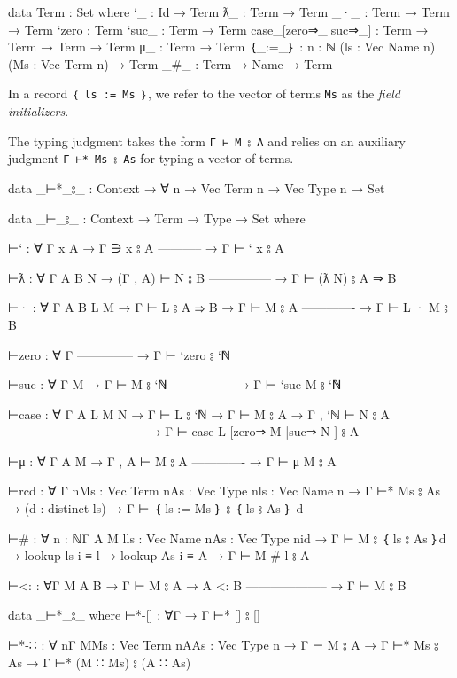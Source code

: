 \begin{fence}
\begin{code}
data Term : Set where
  `_                      : Id → Term
  ƛ_                      : Term → Term
  _·_                     : Term → Term → Term
  `zero                   : Term
  `suc_                   : Term → Term
  case_[zero⇒_|suc⇒_]     : Term → Term → Term → Term
  μ_                      : Term → Term
  ｛_:=_｝                 : {n : ℕ} (ls : Vec Name n) (Ms : Vec Term n) → Term
  _#_                     : Term → Name → Term
\end{code}
\end{fence}

In a record \texttt{｛\ ls\ :=\ Ms\ ｝}, we refer to the vector of terms
\texttt{Ms} as the \emph{field initializers}.

The typing judgment takes the form \texttt{Γ\ ⊢\ M\ ⦂\ A} and relies on
an auxiliary judgment \texttt{Γ\ ⊢*\ Ms\ ⦂\ As} for typing a vector of
terms.

\begin{fence}
\begin{code}
data _⊢*_⦂_ : Context → ∀ {n} → Vec Term n → Vec Type n → Set

data _⊢_⦂_ : Context → Term → Type → Set where

  ⊢` : ∀ {Γ x A}
    → Γ ∋ x ⦂ A
      -----------
    → Γ ⊢ ` x ⦂ A

  ⊢ƛ  : ∀ {Γ A B N}
    → (Γ , A) ⊢ N ⦂ B
      ---------------
    → Γ ⊢ (ƛ N) ⦂ A ⇒ B

  ⊢· : ∀ {Γ A B L M}
    → Γ ⊢ L ⦂ A ⇒ B
    → Γ ⊢ M ⦂ A
      -------------
    → Γ ⊢ L · M ⦂ B

  ⊢zero : ∀ {Γ}
      --------------
    → Γ ⊢ `zero ⦂ `ℕ

  ⊢suc : ∀ {Γ M}
    → Γ ⊢ M ⦂ `ℕ
      ---------------
    → Γ ⊢ `suc M ⦂ `ℕ

  ⊢case : ∀ {Γ A L M N}
    → Γ ⊢ L ⦂ `ℕ
    → Γ ⊢ M ⦂ A
    → Γ , `ℕ ⊢ N ⦂ A
      ---------------------------------
    → Γ ⊢ case L [zero⇒ M |suc⇒ N ] ⦂ A

  ⊢μ : ∀ {Γ A M}
    → Γ , A ⊢ M ⦂ A
      -------------
    → Γ ⊢ μ M ⦂ A

  ⊢rcd : ∀ {Γ n}{Ms : Vec Term n}{As : Vec Type n}{ls : Vec Name n}
     → Γ ⊢* Ms ⦂ As
     → (d : distinct ls)
     → Γ ⊢ ｛ ls := Ms ｝ ⦂ ｛ ls ⦂ As ｝ {d}


  ⊢# : ∀ {n : ℕ}{Γ A M l}{ls : Vec Name n}{As : Vec Type n}{i}{d}
     → Γ ⊢ M ⦂ ｛ ls ⦂ As ｝{d}
     → lookup ls i ≡ l
     → lookup As i ≡ A
     → Γ ⊢ M # l ⦂ A

  ⊢<: : ∀{Γ M A B}
    → Γ ⊢ M ⦂ A   → A <: B
      --------------------
    → Γ ⊢ M ⦂ B

data _⊢*_⦂_ where
  ⊢*-[] : ∀{Γ} → Γ ⊢* [] ⦂ []

  ⊢*-∷ : ∀ {n}{Γ M}{Ms : Vec Term n}{A}{As : Vec Type n}
     → Γ ⊢ M ⦂ A
     → Γ ⊢* Ms ⦂ As
     → Γ ⊢* (M ∷ Ms) ⦂ (A ∷ As)
\end{code}
\end{fence}


